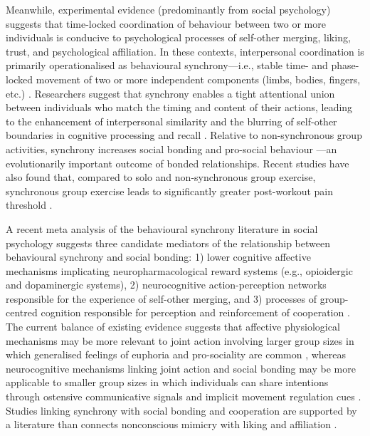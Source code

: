\begin{CJK}{UTF8}{gbsn}
Meanwhile, experimental evidence (predominantly from social psychology) suggests that time-locked coordination of behaviour between two or more individuals is conducive to psychological processes of self-other merging, liking, trust, and psychological affiliation.  In these contexts, interpersonal coordination is primarily operationalised as behavioural synchrony---i.e., stable time- and phase-locked movement of two or more independent components (limbs, bodies, fingers, etc.) \citep{Pikovsky2007}. Researchers suggest that synchrony enables a tight attentional union between individuals who match the timing and content of their actions, leading to the enhancement of interpersonal similarity and the blurring of self-other boundaries in cognitive processing and recall \citep{Cohen2017}.  Relative to non-synchronous group activities, synchrony increases social bonding and pro-social behaviour \citep{Reddish2013,Reddish2013a,Wiltermuth2009}---an evolutionarily important outcome of bonded relationships.  Recent studies have also found that, compared to solo and non-synchronous group exercise, synchronous group exercise leads to significantly greater post-workout pain threshold \citep{Cohen2009,Sullivan2014,Sullivan2013a, Sullivan2013b}.

A recent meta analysis of the behavioural synchrony literature in social psychology suggests three candidate mediators of the relationship between behavioural synchrony and social bonding: 1) lower cognitive affective mechanisms implicating neuropharmacological reward systems (e.g., opioidergic and dopaminergic systems), 2) neurocognitive action-perception networks responsible for the experience of self-other merging, and 3) processes of group-centred cognition responsible for perception and reinforcement of cooperation \citep{Mogan2017}.  The current balance of existing evidence suggests that affective physiological mechanisms may be more relevant to joint action involving larger group sizes in which generalised feelings of euphoria and pro-sociality are common \citep[e.g., mass religious rituals or music festivals, see][]{Weinstein2016}, whereas neurocognitive mechanisms linking joint action and social bonding may be more applicable to smaller group sizes in which individuals can share intentions through ostensive communicative signals and implicit movement regulation cues \citep{Lang2017}.  Studies linking synchrony with social bonding and cooperation are supported by a literature than connects nonconscious mimicry with liking and affiliation \citep{VanBaaren2009}.


\end{CJK}
